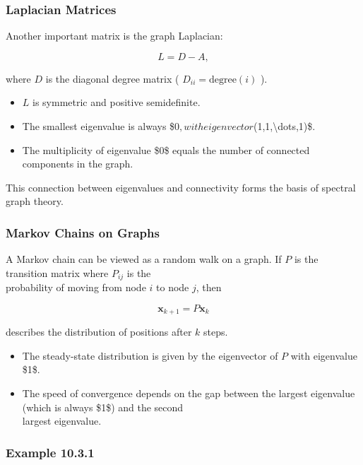 \documentclass[
  12pt,
  a4paper,
]{article}
\begin{document}
\subsubsection{Laplacian Matrices}\label{laplacian-matrices}

Another important matrix is the graph Laplacian:

\[L = D - A,\]

where \(D\) is the diagonal degree matrix (
\(D_{ii} = \text{degree}(i)\) ).

\begin{itemize}
\item
  \(L\) is symmetric and positive semidefinite.
\item
  The smallest eigenvalue is always
  \$0\(, with eigenvector \)(1,1,\textbackslash dots,1)\$.
\item
  The multiplicity of eigenvalue \$0\$ equals the number of connected
  components in the graph.
\end{itemize}

This connection between eigenvalues and connectivity forms the basis of
spectral graph theory.

\subsubsection{Markov Chains on Graphs}\label{markov-chains-on-graphs}

A Markov chain can be viewed as a random walk on a graph. If \(P\) is
the transition matrix where \(P_{ij}\) is the\\
probability of moving from node \(i\) to node \(j\), then

\[\mathbf{x}_{k+1} = P \mathbf{x}_k\]

describes the distribution of positions after \(k\) steps.

\begin{itemize}
\item
  The steady-state distribution is given by the eigenvector of \(P\)
  with eigenvalue \$1\$.
\item
  The speed of convergence depends on the gap between the largest
  eigenvalue (which is always \$1\$) and the second\\
  largest eigenvalue.
\end{itemize}

\subsubsection{Example 10.3.1}\label{example-1031}
\end{document}
